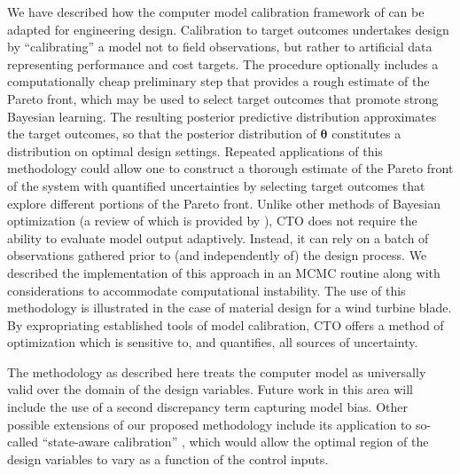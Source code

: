 \documentclass[12pt]{article}
\begin{document}
We have described how the
computer model calibration framework of  \cite{Kennedy2001} can be adapted for engineering design.
%
Calibration to target outcomes undertakes design by ``calibrating'' a model not to field observations, but rather to artificial data representing performance and cost targets.
%
The procedure optionally includes a computationally cheap preliminary step that provides a rough estimate of the Pareto front, which may be used to select target outcomes that promote strong Bayesian learning.
%
The resulting posterior predictive distribution approximates the target outcomes, so that the posterior distribution of $\boldsymbol\theta$ constitutes a distribution on optimal design settings.
%
Repeated applications of this methodology could allow one to construct a thorough estimate of the Pareto front of the system with quantified uncertainties by selecting target outcomes that explore different portions of the Pareto front.
%
Unlike other methods of Bayesian optimization (a review of which is provided by \citealt{Shahriari2016}), CTO does not require the ability to evaluate model output adaptively.
%
Instead, it can rely on a batch of observations gathered prior to (and independently of) the design process.
%
We described the implementation of this approach in an MCMC routine along with considerations to accommodate computational instability.
%
The use of this methodology is illustrated in the case of material design for a wind turbine blade.
%
%
By expropriating established tools of model calibration, CTO offers a method of optimization which is sensitive to, and quantifies, all sources of uncertainty.
%

%
The methodology as described here treats the computer model as universally valid over the domain of the design variables.
%
Future work in this area will include the use of a second discrepancy term capturing model bias.
%
%
Other possible extensions of our proposed methodology include its application to so-called ``state-aware calibration'' \citep{Atamturktur2015,Stevens2018,Brown2016}, which would allow the optimal region of the design variables to vary as a function of the control inputs.
\end{document}
